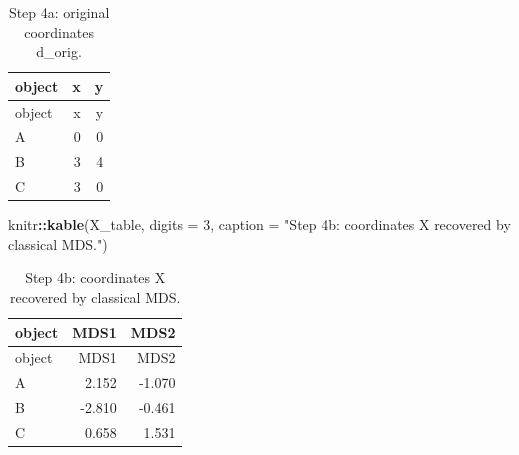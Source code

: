 \documentclass[
  english,
]{article}
\newenvironment{Shaded}{\begin{snugshade}}{\end{snugshade}}
\newcommand{\AttributeTok}[1]{\textcolor[rgb]{0.13,0.29,0.53}{#1}}
\newcommand{\DecValTok}[1]{\textcolor[rgb]{0.00,0.00,0.81}{#1}}
\newcommand{\FunctionTok}[1]{\textcolor[rgb]{0.13,0.29,0.53}{\textbf{#1}}}
\newcommand{\NormalTok}[1]{#1}
\newcommand{\SpecialCharTok}[1]{\textcolor[rgb]{0.81,0.36,0.00}{\textbf{#1}}}
\newcommand{\StringTok}[1]{\textcolor[rgb]{0.31,0.60,0.02}{#1}}
\begin{document}
\begin{longtable}[]{@{}lrr@{}}
\caption{Step 4a: original coordinates d\_orig.}\tabularnewline
\toprule\noalign{}
object & x & y \\
\midrule\noalign{}
\endfirsthead
\toprule\noalign{}
object & x & y \\
\midrule\noalign{}
\endhead
\bottomrule\noalign{}
\endlastfoot
A & 0 & 0 \\
B & 3 & 4 \\
C & 3 & 0 \\
\end{longtable}

\begin{Shaded}
\begin{Highlighting}[]
\NormalTok{knitr}\SpecialCharTok{::}\FunctionTok{kable}\NormalTok{(X\_table, }\AttributeTok{digits =} \DecValTok{3}\NormalTok{, }\AttributeTok{caption =} \StringTok{"Step 4b: coordinates X recovered by classical MDS."}\NormalTok{)}
\end{Highlighting}
\end{Shaded}

\begin{longtable}[]{@{}lrr@{}}
\caption{Step 4b: coordinates X recovered by classical
MDS.}\tabularnewline
\toprule\noalign{}
object & MDS1 & MDS2 \\
\midrule\noalign{}
\endfirsthead
\toprule\noalign{}
object & MDS1 & MDS2 \\
\midrule\noalign{}
\endhead
\bottomrule\noalign{}
\endlastfoot
A & 2.152 & -1.070 \\
B & -2.810 & -0.461 \\
C & 0.658 & 1.531 \\
\end{longtable}
\end{document}
